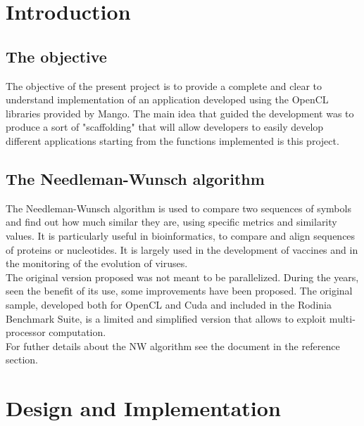 \section{Introduction}

\subsection{The objective}
The objective of the present project is to provide a complete and clear to understand implementation of an application developed using the OpenCL libraries provided by Mango. The main idea that guided the development was to produce a sort of "scaffolding" that will allow developers to easily develop different applications starting from the functions implemented is this project.

\subsection{The Needleman-Wunsch algorithm}
The Needleman-Wunsch algorithm is used to compare two sequences of symbols and find out how much similar they are, using specific metrics and similarity values. It is particularly useful in bioinformatics, to compare and align sequences of proteins or nucleotides. It is largely used in the development of vaccines and in the monitoring of the evolution of viruses.\\The original version proposed was not meant to be parallelized. During the years, seen the benefit of its use, some improvements have been proposed. The original sample, developed both for OpenCL and Cuda and included in the Rodinia Benchmark Suite, is a limited and simplified version that allows to exploit multi-processor computation.\\For futher details about the NW algorithm see the document\cite{nw} in the reference section.

\section{Design and Implementation}

